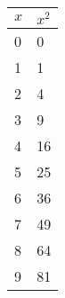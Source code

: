 \begin{tabular}{ll}
$x$ & $x^2$ \\ 
\hline 
0 & 0 \\ 
1 & 1 \\ 
2 & 4 \\ 
3 & 9 \\ 
4 & 16 \\ 
5 & 25 \\ 
6 & 36 \\ 
7 & 49 \\ 
8 & 64 \\ 
9 & 81 \\ 
\end{tabular} 
